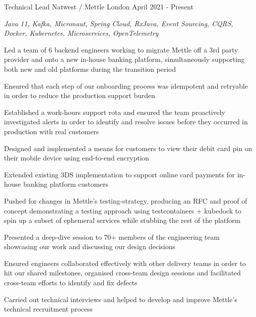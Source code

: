 

\begin{cventries}


  \cventry
    {Technical Lead} %
    {Natwest / Mettle} %
    {London} %
    {April 2021 - Present} %
    {
      \begin{cvitems} %
        \item {\itshape{Java 11, Kafka, Micronaut, Spring Cloud, RxJava, Event Sourcing, CQRS, Docker, Kubernetes, Microservices, OpenTelemetry}}
        \item {Led a team of 6 backend engineers working to migrate Mettle off a 3rd party provider and onto a new in-house banking platform, simultaneously supporting both new and old platforms during the transition period}        
        \item {Ensured that each step of our onboarding process was idempotent and retryable in order to reduce the production support burden}
        \item {Established a work-hours support rota and ensured the team proactively investigated alerts in order to identify and resolve issues before they occurred in production with real customers}
        \item {Designed and implemented a means for customers to view their debit card pin on their mobile device using end-to-end encryption}
        \item {Extended existing 3DS implementation to support online card payments for in-house banking platform customers}
        \item {Pushed for changes in Mettle's testing-strategy, producing an RFC and proof of concept demonstrating a testing approach using testcontainers + kubedock to spin up a subset of ephemeral services while stubbing the rest of the platform}
        \item {Presented a deep-dive session to 70+ members of the engineering team showcasing our work and discussing our design decisions}
        \item {Ensured engineers collaborated effectively with other delivery teams in order to hit our shared milestones, organised cross-team design sessions and facilitated cross-team efforts to identify and fix defects}
        \item {Carried out technical interviews and helped to develop and improve Mettle's technical recruitment process}
      \end{cvitems} 
    }


\end{cventries}
